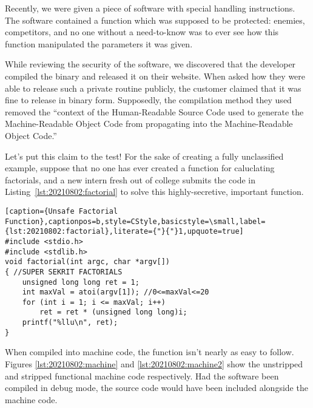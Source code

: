 Recently, we were given a piece of software with special handling instructions. The software contained a function which was supposed to be protected: enemies, competitors, and no one without a need-to-know was to ever see how this function manipulated the parameters it was given.

While reviewing the security of the software, we discovered that the developer compiled the binary and released it on their website. When asked how they were able to release such a private routine publicly, the customer claimed that it was fine to release in binary form. Supposedly, the compilation method they used removed the ``context of the Human-Readable Source Code used to generate the Machine-Readable Object Code from propagating into the Machine-Readable Object Code.''

Let's put this claim to the test! For the sake of creating a fully unclassified example, suppose that no one has ever created a function for caluclating factorials, and a new intern fresh out of college submits the code in Listing~\ref{lst:20210802:factorial} to solve this highly-secretive, important function.
\begin{lstlisting}[caption={Unsafe Factorial Function},captionpos=b,style=CStyle,basicstyle=\small,label={lst:20210802:factorial},literate={"}{"}1,upquote=true]
#include <stdio.h>
#include <stdlib.h>
void factorial(int argc, char *argv[])
{ //SUPER SEKRIT FACTORIALS
	unsigned long long ret = 1;
	int maxVal = atoi(argv[1]); //0<=maxVal<=20
	for (int i = 1; i <= maxVal; i++)
		ret = ret * (unsigned long long)i;
	printf("%llu\n", ret);
}
\end{lstlisting}

When compiled into machine code, the function isn't nearly as easy to follow. Figures \ref{lst:20210802:machine} and \ref{lst:20210802:machine2} show the unstripped and stripped functional machine code respectively. Had the software been compiled in debug mode, the source code would have been included alongside the machine code.

